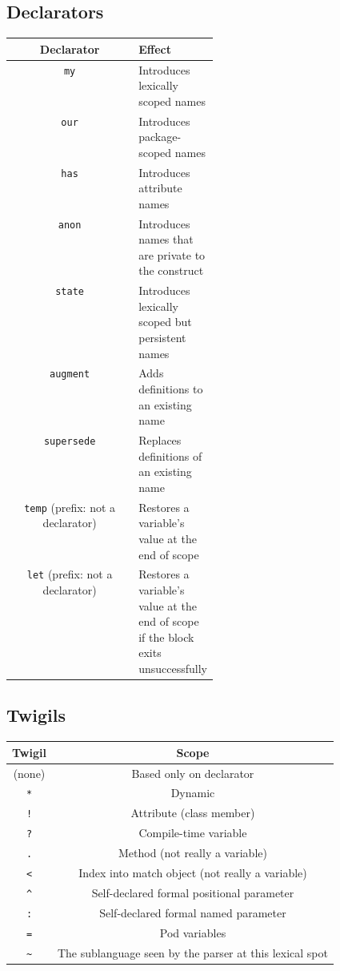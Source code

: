 \documentclass[14pt,english]{extarticle}
\providecommand{\tabularnewline}{\\}
\begin{document}
\subsection*{Declarators}

{\scriptsize{}}%
\begin{tabular}{|c|>{\centering}p{0.3\linewidth}|}
\hline 
\textbf{\small{}Declarator} &
\textbf{\small{}Effect}\tabularnewline
\hline 
\hline 
\texttt{\small{}my} &
{\small{}Introduces lexically scoped names}\tabularnewline
\hline 
\texttt{\small{}our} &
{\small{}Introduces package-scoped names}\tabularnewline
\hline 
\texttt{\small{}has} &
{\small{}Introduces attribute names}\tabularnewline
\hline 
\texttt{\small{}anon} &
{\small{}Introduces names that are private to the construct}\tabularnewline
\hline 
\texttt{\small{}state} &
{\small{}Introduces lexically scoped but persistent names}\tabularnewline
\hline 
\texttt{\small{}augment} &
{\small{}Adds definitions to an existing name}\tabularnewline
\hline 
\texttt{\small{}supersede} &
{\small{}Replaces definitions of an existing name}\tabularnewline
\hline 
\texttt{\small{}temp}{\small{} (prefix: not a declarator)} &
{\small{}Restores a variable's value at the end of scope}\tabularnewline
\hline 
\texttt{\small{}let}{\small{} (prefix: not a declarator)} &
{\small{}Restores a variable's value at the end of scope if the block
exits unsuccessfully}\tabularnewline
\hline 
\end{tabular}{\scriptsize \par}


\subsection*{Twigils}

{\scriptsize{}}%
\begin{tabular}{|c|c|}
\hline 
\textbf{\small{}Twigil} &
\textbf{\small{}Scope}\tabularnewline
\hline 
\hline 
{\small{}(none)} &
{\small{}Based only on declarator}\tabularnewline
\hline 
\texttt{\small{}{*}} &
{\small{}Dynamic}\tabularnewline
\hline 
\texttt{\small{}!} &
{\small{}Attribute (class member)}\tabularnewline
\hline 
\texttt{\small{}?} &
{\small{}Compile-time variable}\tabularnewline
\hline 
\texttt{\small{}.} &
{\small{}Method (not really a variable)}\tabularnewline
\hline 
\texttt{\small{}<} &
{\small{}Index into match object (not really a variable)}\tabularnewline
\hline 
\texttt{\small{}\textasciicircum{}} &
{\small{}Self-declared formal positional parameter}\tabularnewline
\hline 
\texttt{\small{}:} &
{\small{}Self-declared formal named parameter}\tabularnewline
\hline 
\texttt{\small{}=} &
{\small{}Pod variables}\tabularnewline
\hline 
\texttt{\small{}\textasciitilde{}} &
{\small{}The sublanguage seen by the parser at this lexical spot}\tabularnewline
\hline 
\end{tabular}{\scriptsize \par}
\end{document}
